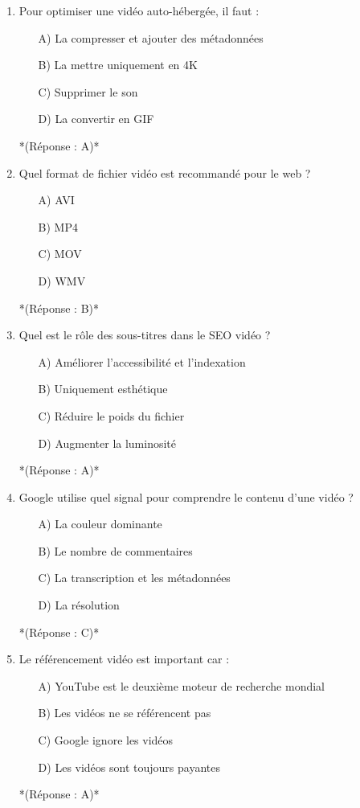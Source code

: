 \documentclass[12pt,a4paper,twoside]{report}
\begin{document}
\begin{enumerate}
    \item Pour optimiser une vidéo auto-hébergée, il faut :
    \begin{itemize}
        \item[A)] La compresser et ajouter des métadonnées
        \item[B)] La mettre uniquement en 4K
        \item[C)] Supprimer le son
        \item[D)] La convertir en GIF
    \end{itemize}
    *(Réponse : A)*

    \item Quel format de fichier vidéo est recommandé pour le web ?
    \begin{itemize}
        \item[A)] AVI
        \item[B)] MP4
        \item[C)] MOV
        \item[D)] WMV
    \end{itemize}
    *(Réponse : B)*

    \item Quel est le rôle des sous-titres dans le SEO vidéo ?
    \begin{itemize}
        \item[A)] Améliorer l'accessibilité et l'indexation
        \item[B)] Uniquement esthétique
        \item[C)] Réduire le poids du fichier
        \item[D)] Augmenter la luminosité
    \end{itemize}
    *(Réponse : A)*

    \item Google utilise quel signal pour comprendre le contenu d'une vidéo ?
    \begin{itemize}
        \item[A)] La couleur dominante
        \item[B)] Le nombre de commentaires
        \item[C)] La transcription et les métadonnées
        \item[D)] La résolution
    \end{itemize}
    *(Réponse : C)*

    \item Le référencement vidéo est important car :
    \begin{itemize}
        \item[A)] YouTube est le deuxième moteur de recherche mondial
        \item[B)] Les vidéos ne se référencent pas
        \item[C)] Google ignore les vidéos
        \item[D)] Les vidéos sont toujours payantes
    \end{itemize}
    *(Réponse : A)*


\end{enumerate}
\end{document}
